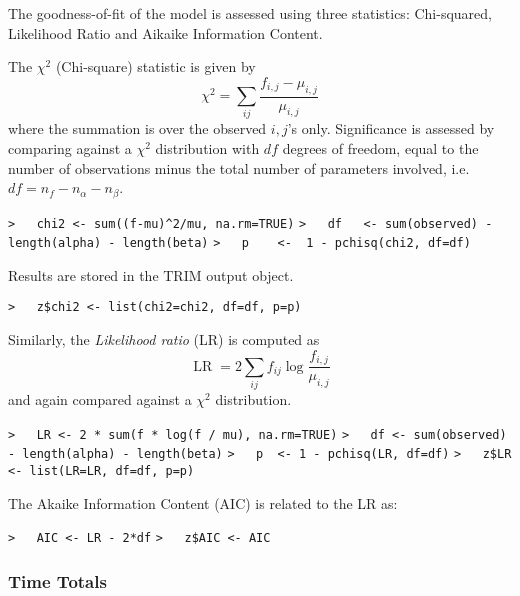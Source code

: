 \documentclass[a4paper]{article}
\begin{document}
The goodness-of-fit of the model is assessed using three statistics:
Chi-squared, Likelihood Ratio and Aikaike Information Content.\par

The $\chi^2$ (Chi-square) statistic is given by
\begin{equation}
  \chi^2 = \sum_{ij}\frac{f_{i,j}-\mu_{i,j}}{\mu_{i,j}}
\end{equation}
where the summation is over the observed $i,j$'s only.
Significance is assessed by comparing against a $\chi^2$ distribution with
$df$ degrees of freedom, equal to the number of observations
minus the total number of parameters involved, i.e.\
$df = n_f - n_\alpha - n_\beta$.\par
\verb~>   chi2 <- sum((f-mu)^2/mu, na.rm=TRUE)~\newline
\verb~>   df   <- sum(observed) - length(alpha) - length(beta)~\newline
\verb~>   p    <-  1 - pchisq(chi2, df=df)~\par
Results are stored in the TRIM output object.\par
\verb~>   z$chi2 <- list(chi2=chi2, df=df, p=p)~\par

Similarly, the \emph{Likelihood ratio} (LR) is computed as
\begin{equation}
  \operatorname{LR} = 2\sum_{ij}f_{ij} \log\frac{f_{i,j}}{\mu_{i,j}}
\end{equation}
and again compared against a $\chi^2$ distribution.\par
\verb~>   LR <- 2 * sum(f * log(f / mu), na.rm=TRUE)~\newline
\verb~>   df <- sum(observed) - length(alpha) - length(beta)~\newline
\verb~>   p  <- 1 - pchisq(LR, df=df)~\newline
\verb~>   z$LR <- list(LR=LR, df=df, p=p)~\par

The Akaike Information Content (AIC) is related to the LR as:\par
\verb~>   AIC <- LR - 2*df~\newline
\verb~>   z$AIC <- AIC~\par



\subsubsection{Time Totals}\par
\end{document}
